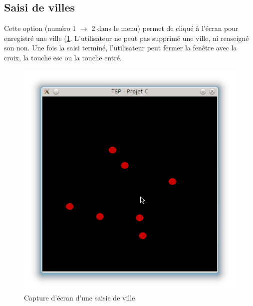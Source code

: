 \documentclass[a4paper,11pt]{article}
\begin{document}
\subsection{Saisi de villes}
Cette option (numéro 1 $\rightarrow$ 2 dans le menu) permet de cliqué à l’écran pour enregistré une ville (\ref{fig2}. L'utilisateur ne peut pas supprimé une ville, ni renseigné son non. Une fois la saisi terminé, l'utilisateur peut fermer la fenêtre avec la croix, la touche esc ou la touche entré.
\begin{center}
\begin{figure}[htbp]
\begin{center}
\includegraphics[scale=0.3]{saisie.png}
\caption{Capture d'écran d'une saisie de ville}
\label{fig2}
\end{center}
\end{figure}
\end{center}
\end{document}
